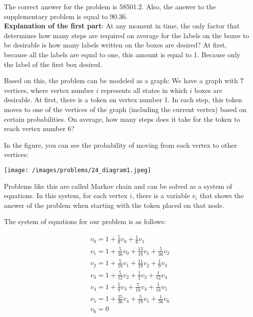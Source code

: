 \begin{solution}
The correct answer for the problem is 58501.2. Also, the answer to the supplementary problem is equal to 90.36.\\[0.2cm]

\textbf{Explanation of the first part}: At any moment in time, the only factor that determines how many steps are required on average for the labels on the boxes to be desirable is how many labels written on the boxes are desired? At first, because all the labels are equal to one, this amount is equal to 1. Because  only the label of the first box desired.

Based on this, the problem can be modeled as a graph:
We have a graph with 7 vertices, where vertex number $i$ represents all states in which $i$ boxes are desirable. At first, there is a token on vertex number  1. In each step, this token moves to one of the vertices of the graph (including the current vertex) based on certain probabilities. On average, how many steps does it take for the token to reach vertex number 6?

In the figure, you can see the probability of moving from each vertex to other vertices:

\begin{center}
	\texttt{[image: /images/problems/24\_diagram1.jpeg]}
\end{center}

Problems like this are called Markov chain and can be solved as a system of equations. In this system, for each vertex $i$, there is a variable $v_i$ that shows the answer of the problem when starting with the token placed on that node.

The system of equations for our problem is as follows:

$$
\begin{aligned}
&v_0 = 1 + \frac{5}{6}v_0 + \frac{1}{6}v_1 \\
&v_1 = 1 + \frac{5}{36}v_0 + \frac{13}{18}v_1 + \frac{5}{36}v_2 \\
&v_2 = 1 + \frac{5}{18}v_1 + \frac{11}{18}v_2 + \frac{1}{9}v_3 \\
&v_3 = 1 + \frac{5}{12}v_2 + \frac{1}{2}v_3 + \frac{1}{12}v_4 \\
&v_4 = 1 + \frac{5}{9}v_3 + \frac{7}{18}v_4 + \frac{1}{18}v_5 \\
&v_5 = 1 + \frac{25}{36}v_4 + \frac{5}{18}v_5 + \frac{1}{36}v_6 \\
&v_6 = 0
\end{aligned}
$$


\end{solution}
